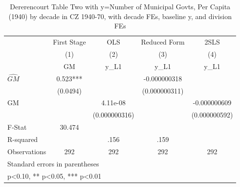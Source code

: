 \begin{table}[htbp]\centering
\def\sym#1{\ifmmode^{#1}\else\(^{#1}\)\fi}
\caption{Dererencourt Table Two with y=Number of Municipal Govts, Per Capita (1940) by decade in CZ 1940-70, with decade FEs, baseline y, and division FEs}
\begin{tabular}{l*{4}{c}}
\toprule
                    & First Stage   &         OLS   &Reduced Form   &        2SLS   \\
                    &\multicolumn{1}{c}{(1)}&\multicolumn{1}{c}{(2)}&\multicolumn{1}{c}{(3)}&\multicolumn{1}{c}{(4)}\\
                    &\multicolumn{1}{c}{GM}&\multicolumn{1}{c}{y\_L1}&\multicolumn{1}{c}{y\_L1}&\multicolumn{1}{c}{y\_L1}\\
\midrule
$\hat{GM}$          &       0.523***&               &-0.000000318   &               \\
                    &    (0.0494)   &               &(0.000000311)   &               \\
\addlinespace
GM                  &               &    4.11e-08   &               &-0.000000609   \\
                    &               &(0.000000316)   &               &(0.000000592)   \\
\midrule
F-Stat              &      30.474   &               &               &               \\
R-squared           &               &        .156   &        .159   &               \\
Observations        &         292   &         292   &         292   &         292   \\
\bottomrule
\multicolumn{5}{l}{\footnotesize Standard errors in parentheses}\\
\multicolumn{5}{l}{\footnotesize * p<0.10, ** p<0.05, *** p<0.01}\\
\end{tabular}
\end{table}
